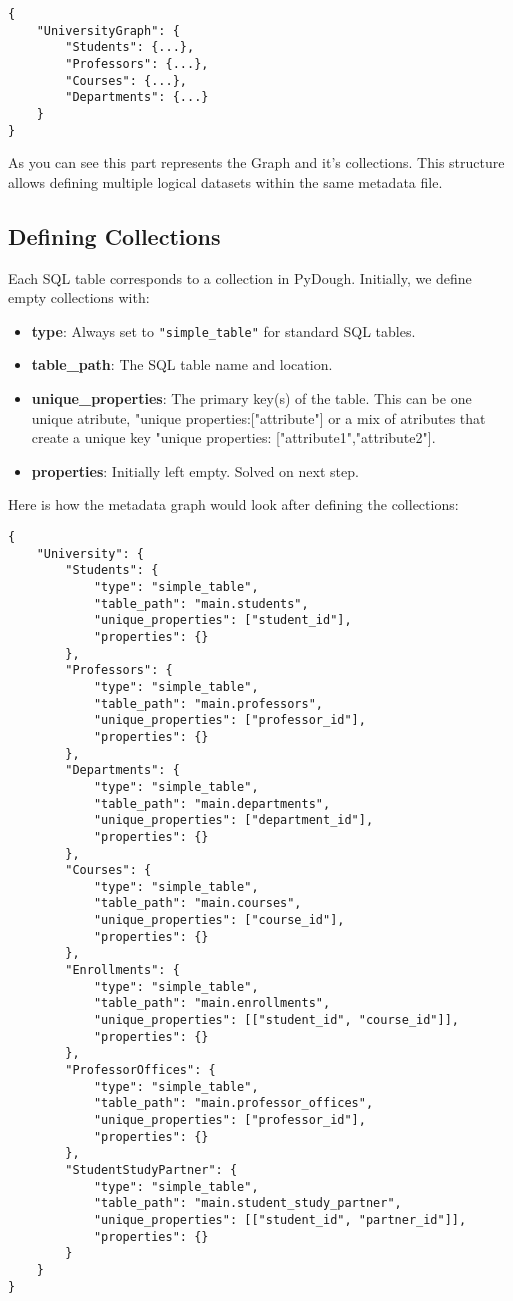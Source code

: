 \documentclass{article}
\begin{document}
\begin{verbatim}
{
    "UniversityGraph": {
        "Students": {...},
        "Professors": {...},
        "Courses": {...},
        "Departments": {...}
    }
}
\end{verbatim}

As you can see this part represents the Graph and it's collections. This structure allows defining multiple logical datasets within the same metadata file.

\subsection{Defining Collections}
Each SQL table corresponds to a collection in PyDough. Initially, we define empty collections with:
\begin{itemize}
    \item \textbf{type}: Always set to \texttt{"simple\_table"} for standard SQL tables.
    \item \textbf{table\_path}: The SQL table name and location.
    \item \textbf{unique\_properties}: The primary key(s) of the table. This can be one unique atribute, "unique properties:["attribute"] or a mix of atributes that create a unique key "unique properties: ["attribute1","attribute2"].
    \item \textbf{properties}: Initially left empty. Solved on next step.
\end{itemize}

Here is how the metadata graph would look after defining the collections: 

\begin{verbatim}
{
    "University": {
        "Students": {
            "type": "simple_table",
            "table_path": "main.students",
            "unique_properties": ["student_id"],
            "properties": {}
        },
        "Professors": {
            "type": "simple_table",
            "table_path": "main.professors",
            "unique_properties": ["professor_id"],
            "properties": {}
        },
        "Departments": {
            "type": "simple_table",
            "table_path": "main.departments",
            "unique_properties": ["department_id"],
            "properties": {}
        },
        "Courses": {
            "type": "simple_table",
            "table_path": "main.courses",
            "unique_properties": ["course_id"],
            "properties": {}
        },
        "Enrollments": {
            "type": "simple_table",
            "table_path": "main.enrollments",
            "unique_properties": [["student_id", "course_id"]],
            "properties": {}
        },
        "ProfessorOffices": {
            "type": "simple_table",
            "table_path": "main.professor_offices",
            "unique_properties": ["professor_id"],
            "properties": {}
        },
        "StudentStudyPartner": {
            "type": "simple_table",
            "table_path": "main.student_study_partner",
            "unique_properties": [["student_id", "partner_id"]],
            "properties": {}
        }
    }
}
\end{verbatim}
\end{document}
